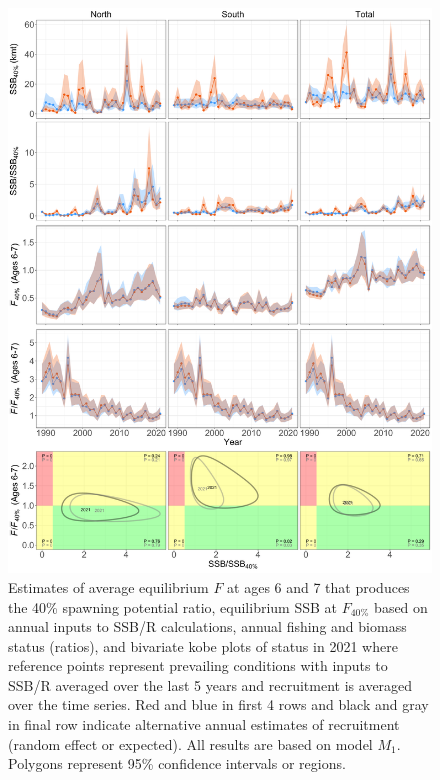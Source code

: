\documentclass[
]{article}
\begin{document}
\begin{figure}

{\centering \includegraphics[height=0.85\textheight]{brp_status_results} 

}

\caption{Estimates of average equilibrium $F$ at ages 6 and 7 that produces the 40\% spawning potential ratio, equilibrium SSB at $F_{40\%}$ based on annual inputs to SSB/R calculations, annual fishing and biomass status (ratios), and bivariate kobe plots of status in 2021 where reference points represent prevailing conditions with inputs to SSB/R averaged over the last 5 years and recruitment is averaged over the time series. Red and blue in first 4 rows and black and gray in final row indicate alternative annual estimates of recruitment (random effect or expected). All results are based on model $M_1$. Polygons represent 95\% confidence intervals or regions.}\label{fig:annual-BRPs}
\end{figure}
\end{document}

